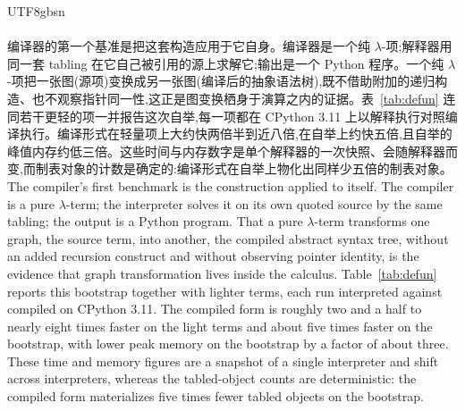 \begin{CJK*}{UTF8}{gbsn}
  \paragraph{}
  \ifTablambdaChinese
  编译器的第一个基准是把这套构造应用于它自身。编译器是一个纯 $\lambda$-项;解释器用同一套 tabling 在它自己被引用的源上求解它;输出是一个 Python 程序。一个纯 $\lambda$-项把一张图(源项)变换成另一张图(编译后的抽象语法树),既不借助附加的递归构造、也不观察指针同一性,这正是图变换栖身于演算之内的证据。表~\ref{tab:defun} 连同若干更轻的项一并报告这次自举,每一项都在 CPython 3.11 上以解释执行对照编译执行。编译形式在轻量项上大约快两倍半到近八倍,在自举上约快五倍,且自举的峰值内存约低三倍。这些时间与内存数字是单个解释器的一次快照、会随解释器而变,而制表对象的计数是确定的:编译形式在自举上物化出同样少五倍的制表对象。
  \else
  The compiler's first benchmark is the construction applied to itself. The compiler is a pure $\lambda$-term; the interpreter solves it on its own quoted source by the same tabling; the output is a Python program. That a pure $\lambda$-term transforms one graph, the source term, into another, the compiled abstract syntax tree, without an added recursion construct and without observing pointer identity, is the evidence that graph transformation lives inside the calculus. Table~\ref{tab:defun} reports this bootstrap together with lighter terms, each run interpreted against compiled on CPython 3.11. The compiled form is roughly two and a half to nearly eight times faster on the light terms and about five times faster on the bootstrap, with lower peak memory on the bootstrap by a factor of about three. These time and memory figures are a snapshot of a single interpreter and shift across interpreters, whereas the tabled-object counts are deterministic: the compiled form materializes five times fewer tabled objects on the bootstrap.
  \fi

  \begin{table}
    \caption{}
    \label{tab:defun}
    \centering\footnotesize
    \setlength{\tabcolsep}{4pt}
    \resizebox{\textwidth}{!}{}
  \end{table}


\end{CJK*}
